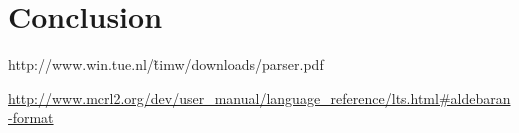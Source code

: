 \documentclass[10pt,a4paper]{article}
\begin{document}
\section{Conclusion}\label{conc}


\begin{thebibliography}{9}

 http://www.win.tue.nl/\~timw/downloads/parser.pdf

\end{thebibliography}


\begin{comment}
A picture of the labelled transition system.

\begin{tikzpicture}[->,>=stealth', shorten >=1pt,auto, node distance=2.8cm, semithick]
  \tikzstyle{every state}=[text=black]

  \node[initial,state] (0)                    {$0$};
  \node[state]         (1) [right of=0] {$1$};
  \node[state]         (2) [below of=0] {$2$};
  \node[state]         (3) [right of=1] {$3$};
  \node[state]         (4) [below of=1] {$4$};
  \node[state]         (5) [below of=2] {$5$};
  \node[state]         (6) [right of=4] {$6$};
  \node[state]         (7) [below of=4] {$7$};
  
 \path (0) edge node {$\tau$} (1)
 	   (0) edge node {$\tau$} (2)
 	   (1) edge node {$\tau$} (3)
 	   (1) edge node {$\tau$} (4)
 	   (2) edge node {$\tau$} (5)
 	   (2) edge node {$\tau$} (4)
 	   (3) edge node {$a$} 	  (6)
 	   (3) edge [bend right] node {$b$} 	  (0)
 	   (4) edge node {$\tau$} (6)
 	   (4) edge node {$\tau$} (7)
 	   (5) edge [bend left] node {$a$}    (0)
 	   (5) edge node {$a$}    (7)
 	   (6) edge [bend right] node {$\tau$} (2)
 	   (7) edge [bend right] node {$b$}    (1);
\end{tikzpicture}
\end{comment}

\begin{thebibliography}{9}
	 \url{http://www.mcrl2.org/dev/user_manual/language_reference/lts.html#aldebaran-format}
\end{thebibliography}
\end{document}
